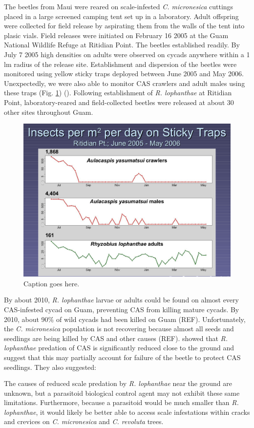 \documentclass[12pt,letterpaper,english,bibliography=totocnumbered, abstract=on]{scrartcl}
\begin{document}
The beetles from Maui were reared on scale-infested \textit{C. micronesica} cuttings placed in a large screened camping tent set up in a laboratory. Adult offspring were collected for field release by aspirating them from the walls of the tent into plasic vials. Field releases were initiated on February 16 2005 at the Guam National Wildlife Refuge at Ritidian Point. The beetles established readily. By July 7 2005 high densities on adults were observed on cycads anywhere within a 1 lm radius of the release site.  Establishment and dispersion of the beetles were monitored using yellow sticky traps deployed between June 2005 and May 2006. Unexpectedly, we were also able to monitor CAS crawlers and adult males using these traps (Fig. \ref{fig:sticky-traps})  (\cite{moore_biological_2017-2}). Following establishment of \textit{R. lophanthae} at Ritidian Point, laboratory-reared and field-collected beetles were released at about 30 other sites throughout Guam. 

\begin{figure}[H]
	\centering
	\includegraphics[width=0.7\linewidth]{sticky-traps}
	\caption{Caption goes here.}
	\label{fig:sticky-traps}
\end{figure}

By about 2010, \textit{R. lophanthae} larvae or adults could be found on almost every CAS-infested cycad on Guam, preventing CAS from killing mature cycads. By 2010, about 90\% of wild cycads had been killed on Guam (REF). Unfortunately, the \textit{C. micronesica} population is not recovering because almost all seeds and seedlings are being killed by CAS and other causes (REF). \cite{marlerVerticalStratificationPredation2013} showed that \textit{R. lophanthae} predation of CAS is significantly reduced close to the ground and suggest that this may partially account for failure of the beetle to protect CAS seedlings. They also suggested:
\begin{displayquote}
The causes of reduced scale predation by
\textit{R. lophanthae} near the ground are unknown,
but a parasitoid biological control agent may
not exhibit these same limitations. Furthermore, because a parasitoid would be much
smaller than \textit{R. lophanthae}, it would likely be
better able to access scale infestations within
cracks and crevices on \textit{C. micronesica} and
\textit{C. revoluta} trees.
\end{displayquote}
\end{document}
